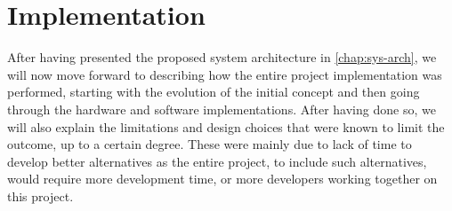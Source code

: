 \chapter{Implementation} \label{chap:impl}

After having presented the proposed system architecture in \autoref{chap:sys-arch}, we will now move forward to describing how the entire project implementation was performed, starting with the evolution of the initial concept and then going through the hardware and software implementations.
After having done so, we will also explain the limitations and design choices that were known to limit the outcome, up to a certain degree.
These were mainly due to lack of time to develop better alternatives as the entire project, to include such alternatives, would require more development time, or more developers working together on this project.










